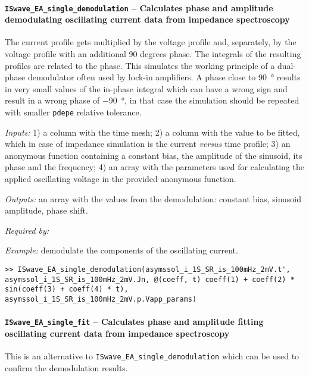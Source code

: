 		
		\paragraph{\texttt{ISwave\_EA\_single\_demodulation} -- Calculates phase and amplitude demodulating oscillating current data from impedance spectroscopy}
		The current profile gets multiplied by the voltage profile and,
		 separately, by the voltage profile with an additional 90 degrees phase.
		 The integrals of the resulting profiles are related to the phase.
		 This simulates the working principle of a dual-phase demodulator often
		 used by lock-in amplifiers.
		 A phase close to \SI{90}{\degree} results in very small values of
		 the in-phase integral which can have a wrong sign and result in a wrong phase of
		 \SI{-90}{\degree}, in that case the simulation should be repeated with smaller \texttt{pdepe}
		 relative tolerance.
		
		\textit{Inputs:} 1) a column with the time mesh;
		   2) a column with the value to be fitted, which in case of impedance simulation is the current \textsl{versus} time profile;
		   3) an anonymous function containing a constant bias, the amplitude of
		     the sinusoid, its phase and the frequency;
		   4) an array with the parameters used for calculating the applied
		     oscillating voltage in the provided anonymous function.
		
		\textit{Outputs:} an array with the values from the demodulation: constant
		     bias, sinusoid amplitude, phase shift.
		
		
		\textit{Required by:} 
		
		
		\textit{Example:} demodulate the components of the oscillating current.
		\begin{lstlisting}[style=Matlab-editor]
>> ISwave_EA_single_demodulation(asymssol_i_1S_SR_is_100mHz_2mV.t', asymssol_i_1S_SR_is_100mHz_2mV.Jn, @(coeff, t) coeff(1) + coeff(2) * sin(coeff(3) + coeff(4) * t), asymssol_i_1S_SR_is_100mHz_2mV.p.Vapp_params)
		\end{lstlisting}
		
		
\paragraph{\texttt{ISwave\_EA\_single\_fit} -- Calculates phase and amplitude fitting oscillating current data from impedance spectroscopy}
This is an alternative to \texttt{ISwave\_EA\_single\_demodulation} which can be used to confirm the demodulation results.

